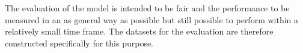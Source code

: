 The evaluation of the model is intended to be fair and the performance to be measured in an as general way as possible but still possible to perform within a relatively small time frame. The datasets for the evaluation are therefore constructed specifically for this purpose. 






